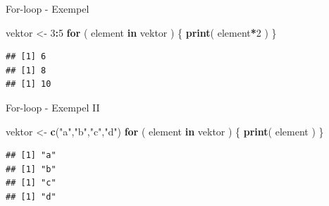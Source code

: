 \documentclass[
  11pt,
  ignorenonframetext,
]{beamer}
\newenvironment{Shaded}{\begin{snugshade}}{\end{snugshade}}
\newcommand{\ControlFlowTok}[1]{\textcolor[rgb]{0.13,0.29,0.53}{\textbf{#1}}}
\newcommand{\DecValTok}[1]{\textcolor[rgb]{0.00,0.00,0.81}{#1}}
\newcommand{\FunctionTok}[1]{\textcolor[rgb]{0.13,0.29,0.53}{\textbf{#1}}}
\newcommand{\NormalTok}[1]{#1}
\newcommand{\OtherTok}[1]{\textcolor[rgb]{0.56,0.35,0.01}{#1}}
\newcommand{\SpecialCharTok}[1]{\textcolor[rgb]{0.81,0.36,0.00}{\textbf{#1}}}
\newcommand{\StringTok}[1]{\textcolor[rgb]{0.31,0.60,0.02}{#1}}
\begin{document}
\begin{frame}[fragile]{For-loop - Exempel}
\label{for-loop---exempel}
\begin{Shaded}
\begin{Highlighting}[]
\NormalTok{vektor }\OtherTok{\textless{}{-}} \DecValTok{3}\SpecialCharTok{:}\DecValTok{5}
\ControlFlowTok{for}\NormalTok{ ( element }\ControlFlowTok{in}\NormalTok{ vektor ) \{}
  \FunctionTok{print}\NormalTok{( element}\SpecialCharTok{*}\DecValTok{2}\NormalTok{ )}
\NormalTok{\}}
\end{Highlighting}
\end{Shaded}

\pause

\begin{verbatim}
## [1] 6
## [1] 8
## [1] 10
\end{verbatim}
\end{frame}

\begin{frame}[fragile]{For-loop - Exempel II}
\label{for-loop---exempel-ii}
\begin{Shaded}
\begin{Highlighting}[]
\NormalTok{vektor }\OtherTok{\textless{}{-}} \FunctionTok{c}\NormalTok{(}\StringTok{"a"}\NormalTok{,}\StringTok{"b"}\NormalTok{,}\StringTok{"c"}\NormalTok{,}\StringTok{"d"}\NormalTok{)}
\ControlFlowTok{for}\NormalTok{ ( element }\ControlFlowTok{in}\NormalTok{ vektor ) \{}
  \FunctionTok{print}\NormalTok{( element )}
\NormalTok{\}}
\end{Highlighting}
\end{Shaded}

\pause

\begin{verbatim}
## [1] "a"
## [1] "b"
## [1] "c"
## [1] "d"
\end{verbatim}
\end{frame}
\end{document}
